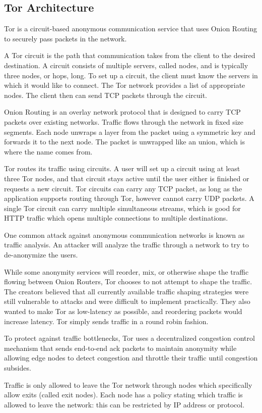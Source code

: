 \documentclass[12pt,journal]{IEEEtran}
\begin{document}
\subsection{Tor Architecture}
Tor is a circuit-based anonymous communication service that uses Onion Routing to securely pass packets in the network.
\par
A Tor circuit is the path that communication takes from the client to the desired destination. A circuit consists of multiple servers, called nodes, and is typically three nodes, or hops, long. To set up a circuit, the client must know the servers in which it would like to connect. The Tor network provides a list of appropriate nodes. The client then can send TCP packets through the circuit.
\par
Onion Routing is an overlay network protocol that is designed to carry TCP packets over existing networks. Traffic flows through the network in fixed size segments. Each node unwraps a layer from the packet using a symmetric key and forwards it to the next node. The packet is unwrapped like an union, which is where the name comes from.
\par
Tor routes its traffic using circuits. A user will set up a circuit using at least three Tor nodes, and that circuit stays active until the user either is finished or requests a new circuit. Tor circuits can carry any TCP packet, as long as the application supports routing through Tor, however cannot carry UDP packets. A single Tor circuit can carry multiple simultaneous streams, which is good for HTTP traffic which opens multiple connections to multiple destinations.
\par
One common attack against anonymous communication networks is known as traffic analysis. An attacker will analyze the traffic through a network to try to de-anonymize the users.
\par
While some anonymity services will reorder, mix, or otherwise shape the traffic flowing between Onion Routers, Tor chooses to not attempt to shape the traffic. The creators believed that all currently available traffic shaping strategies were still vulnerable to attacks and were difficult to implement practically. They also wanted to make Tor as low-latency as possible, and reordering packets would increase latency. Tor simply sends traffic in a round robin fashion.
\par
To protect against traffic bottlenecks, Tor uses a decentralized congestion control mechanism that sends end-to-end ack packets to maintain anonymity while allowing edge nodes to detect congestion and throttle their traffic until congestion subsides.
\par
Traffic is only allowed to leave the Tor network through nodes which specifically allow exits (called exit nodes). Each node has a policy stating which traffic is allowed to leave the network: this can be restricted by IP address or protocol. \cite{Dingledine:2004:TSO:1251375.1251396}
\end{document}
